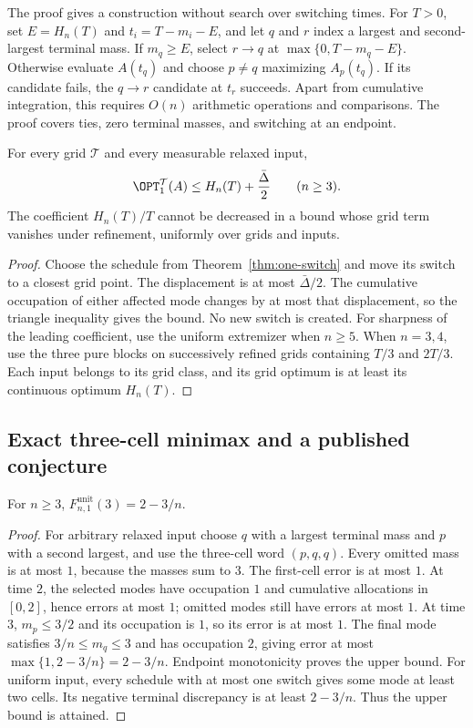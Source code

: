 The proof gives a construction without search over switching times. For
$T>0$, set $E=H_n(T)$ and $t_i=T-m_i-E$, and let $q$ and $r$
index a largest and second-largest terminal mass. If $m_q\ge E$, select
$r\to q$ at $\max\{0,T-m_q-E\}$. Otherwise evaluate $A(t_q)$ and
choose $p\ne q$ maximizing $A_p(t_q)$. If its candidate fails, the
$q\to r$ candidate at $t_r$ succeeds. Apart from cumulative integration,
this requires $O(n)$ arithmetic operations and comparisons. The proof covers
ties, zero terminal masses, and switching at an endpoint.

\begin{corollary}\label{cor:one-switch-grid}
For every grid $\mathcal T$ and every measurable relaxed input,
\[
 \OPT_1^{\mathcal T}(A)\le H_n(T)+\frac{\bar\Delta}{2}\qquad(n\ge3).
\]
The coefficient $H_n(T)/T$ cannot be decreased in a bound whose grid term
vanishes under refinement, uniformly over grids and inputs.
\end{corollary}
\begin{proof}
Choose the schedule from Theorem~\ref{thm:one-switch} and move its switch to
a closest grid point. The displacement is at most $\bar\Delta/2$. The
cumulative occupation of either affected mode changes by at most that
displacement, so the triangle inequality gives the bound. No new switch is
created. For sharpness of the leading coefficient, use the uniform extremizer
when $n\ge5$. When $n=3,4$, use the three pure blocks on successively refined
grids containing $T/3$ and $2T/3$. Each input belongs to its grid class, and
its grid optimum is at least its continuous optimum $H_n(T)$.
\end{proof}

\subsection{Exact three-cell minimax and a published conjecture}

\begin{proposition}\label{prop:three-cells}
For $n\ge3$, $F^{\mathrm{unit}}_{n,1}(3)=2-3/n$.
\end{proposition}
\begin{proof}
For arbitrary relaxed input choose $q$ with a largest terminal mass and $p$
with a second largest, and use the three-cell word $(p,q,q)$. Every omitted
mass is at most $1$, because the masses sum to $3$. The first-cell error is
at most $1$. At time $2$, the selected modes have occupation $1$ and
cumulative allocations in $[0,2]$, hence errors at most $1$; omitted modes
still have errors at most $1$. At time $3$, $m_p\le3/2$ and its occupation
is $1$, so its error is at most $1$. The final mode satisfies
$3/n\le m_q\le3$ and has occupation $2$, giving error at most
$\max\{1,2-3/n\}=2-3/n$. Endpoint monotonicity proves the upper bound.
For uniform input, every schedule with at most one switch gives some mode
at least two cells. Its negative terminal discrepancy is at least
$2-3/n$. Thus the upper bound is attained.
\end{proof}


